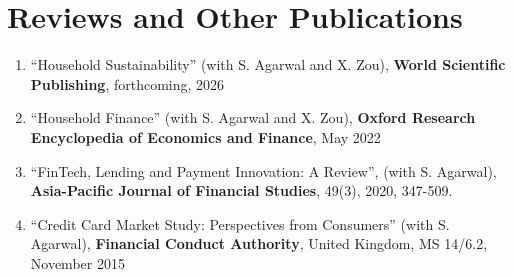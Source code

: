 \documentclass[margin,line]{res}
\begin{document}
\begin{resume}
\begin{enumerate}

\end{enumerate}

\section{\sc Reviews and Other Publications}
\begin{enumerate}
\item %
``Household Sustainability'' (with S. Agarwal and X. Zou), \textbf{World Scientific Publishing}, forthcoming, 2026
\vspace*{0.2cm}
\item %
``Household Finance'' (with S. Agarwal and X. Zou), \textbf{Oxford Research Encyclopedia of Economics and Finance}, May 2022
\vspace*{0.2cm} 	
\item %
``FinTech, Lending and Payment Innovation: A Review'', (with S. Agarwal), \textbf{Asia-Pacific Journal of Financial Studies}, 49(3), 2020, 347-509.
\vspace*{0.2cm} 	
	\item %
 ``Credit Card Market Study: Perspectives from Consumers'' (with S. Agarwal), \textbf{Financial Conduct Authority}, United Kingdom, MS 14/6.2, November 2015

\end{enumerate}

\iffalse


\end{resume}
\end{document}
